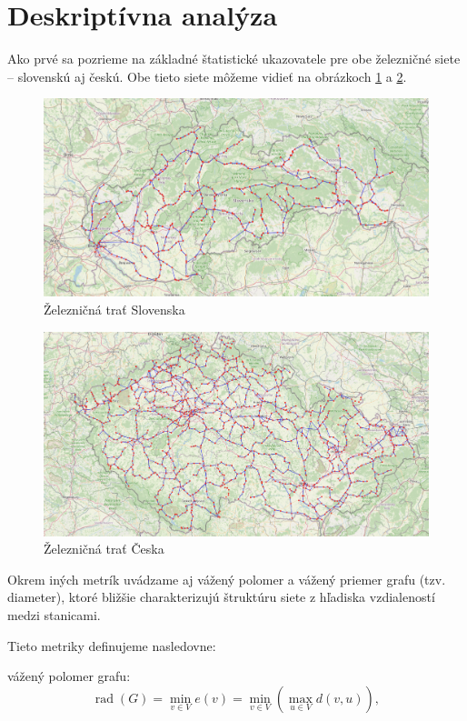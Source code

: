 \documentclass[main.tex]{subfiles}
\begin{document}
\section{Deskriptívna analýza}
Ako prvé sa pozrieme na základné štatistické ukazovatele pre obe železničné siete – slovenskú aj českú. Obe tieto siete môžeme vidieť na obrázkoch \ref{obr:1} a \ref{obr:2}.
\begin{figure}
    \centerline{\includegraphics[width=1\textwidth]{images/sk_railroads.png}}
    \caption{Železničná trať Slovenska}
    \label{obr:1}
\end{figure}

\begin{figure}
    \centerline{\includegraphics[width=1\textwidth]{images/cze_railroads.png}}
    \caption{Železničná trať Česka}
    \label{obr:2}
\end{figure}


Okrem iných metrík uvádzame aj vážený polomer a vážený priemer grafu (tzv. diameter), ktoré bližšie charakterizujú štruktúru siete z hľadiska vzdialeností medzi stanicami.

Tieto metriky definujeme nasledovne:

vážený polomer grafu:
\[
\operatorname{rad}(G) = \min_{v \in V} e(v) = \min_{v \in V} \left( \max_{u \in V} d(v, u) \right),
\]
\end{document}
